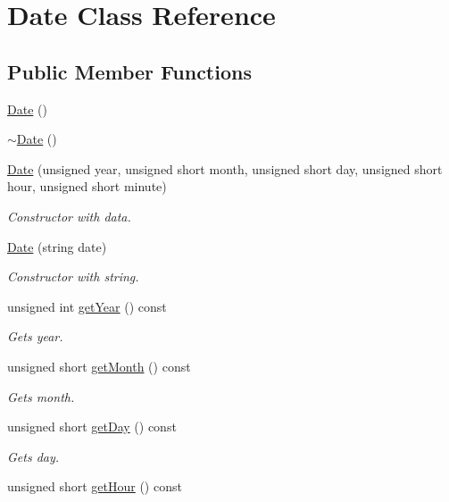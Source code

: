 \hypertarget{class_date}{}\section{Date Class Reference}
\label{class_date}
\subsection*{Public Member Functions}
\begin{DoxyCompactItemize}
\item 
\hyperlink{class_date_a4e59ed4ba66eec61c27460c5d09fa1bd}{Date} ()
\item 
\hyperlink{class_date_ade4b469433b7966cc034cbcc6799233b}{$\sim$\+Date} ()
\item 
\hyperlink{class_date_a5277264fbbce7f4ebfcbcc362d6d62e7}{Date} (unsigned year, unsigned short month, unsigned short day, unsigned short hour, unsigned short minute)
\begin{DoxyCompactList}\small\item\em Constructor with data. \end{DoxyCompactList}\item 
\hyperlink{class_date_a5532efafed41fd5f8e013a61313200dc}{Date} (string date)
\begin{DoxyCompactList}\small\item\em Constructor with string. \end{DoxyCompactList}\item 
unsigned int \hyperlink{class_date_aa1e4066bffc24af79f604dabce27e3cc}{get\+Year} () const
\begin{DoxyCompactList}\small\item\em Gets year. \end{DoxyCompactList}\item 
unsigned short \hyperlink{class_date_ad077bd6ae19462875a8bd10aed9a6233}{get\+Month} () const
\begin{DoxyCompactList}\small\item\em Gets month. \end{DoxyCompactList}\item 
unsigned short \hyperlink{class_date_af02c2f0b61b6e14efbc3ccb0f7f0d567}{get\+Day} () const
\begin{DoxyCompactList}\small\item\em Gets day. \end{DoxyCompactList}\item 
unsigned short \hyperlink{class_date_a49673a3830aada7b4b55616b5848c843}{get\+Hour} () const

\end{DoxyCompactItemize}
